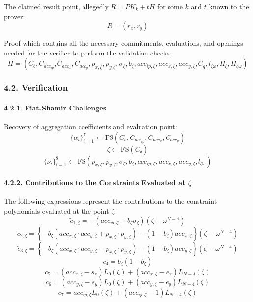 \documentclass[
]{article}
\begin{document}
The claimed result point, allegedly \(R = PK_k + tH\) for some \(k\) and
\(t\) known to the prover: \[R = (r_x, r_y)\]

Proof which contains all the necessary commitments, evaluations, and
openings needed for the verifier to perform the validation checks: \[
\Pi = (C_b, C_{acc_{ip}}, C_{acc_x}, C_{acc_y}, p_{x,\zeta}, p_{y,\zeta}, \sigma_\zeta, b_\zeta, acc_{ip,\zeta}, acc_{x,\zeta}, acc_{y,\zeta}, C_q, l_{\zeta\omega}, \Pi_\zeta, \Pi_{\zeta\omega})
\]

\subsubsection{4.2. Verification}\label{verification}

\paragraph{4.2.1. Fiat-Shamir Challenges}\label{fiat-shamir-challenges}

Recovery of aggregation coefficients and evaluation point:
\[\{\alpha_i\}_{i=1}^7 \leftarrow \text{FS}(C_b, C_{acc_{ip}}, C_{acc_x}, C_{acc_y})\]
\[\zeta \leftarrow \text{FS}(C_q)\]
\[\{\nu_i\}_{i=1}^8 \leftarrow \text{FS}(p_{x,\zeta}, p_{y,\zeta}, \sigma_\zeta, b_\zeta, acc_{ip,\zeta}, acc_{x,\zeta}, acc_{y,\zeta}, l_{\zeta\omega})\]

\paragraph{\texorpdfstring{4.2.2. Contributions to the Constraints
Evaluated at
\(\zeta\)}{4.2.2. Contributions to the Constraints Evaluated at \textbackslash zeta}}\label{contributions-to-the-constraints-evaluated-at-zeta}

The following expressions represent the contributions to the constraint
polynomials evaluated at the point \(\zeta\):
\[\tilde{c}_{1,\zeta}=-(acc_{ip,\zeta}+b_\zeta \sigma_\zeta)(\zeta-\omega^{N-4})\]
\[\tilde{c}_{2,\zeta}=\left\{-b_\zeta(acc_{x,\zeta} \cdot acc_{y,\zeta}+p_{x,\zeta} \cdot p_{y,\zeta})-(1-b_\zeta)acc_{x,\zeta}\right\}(\zeta-\omega^{N-4})\]
\[\tilde{c}_{3,\zeta}=\left\{-b_\zeta(acc_{x,\zeta} \cdot acc_{y,\zeta}-p_{x,\zeta} \cdot p_{y,\zeta})-(1-b_\zeta)acc_{y,\zeta}\right\}(\zeta-\omega^{N-4})\]
\[c_4=b_{\zeta}(1-b_{\zeta})\]
\[c_5=(acc_{x,\zeta}-s_x)L_0(\zeta)+(acc_{x,\zeta}-e_x)L_{N-4}(\zeta)\]
\[c_6=(acc_{y,\zeta}-s_y)L_0(\zeta)+(acc_{y,\zeta}-e_y)L_{N-4}(\zeta)\]
\[c_7=acc_{ip,\zeta}L_0(\zeta)+(acc_{ip,\zeta}-1)L_{N-4}(\zeta)\]
\end{document}
